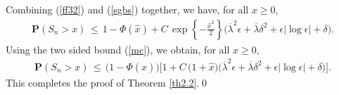 \documentclass{gSTA2e}
\theoremstyle{plain}
\theoremstyle{definition}
\theoremstyle{remark}
\begin{document}
Combining (\ref{ff32}) and (\ref{sgbs}) together,  we have, for all $ x\geq 0 ,$
\begin{eqnarray*}
 \mathbf{P}(S_n>x ) \, \leq \,  1- \Phi\left( \widehat{x}\right)
  +  C\, \exp \left\{- \frac{\widehat{x}^2}{2 }  \right\}  \Big(\overline{\lambda}^2 \epsilon + \overline{\lambda} \delta^2 + \epsilon \left| \log  \epsilon
 \right| +   \delta  \Big)  .
\end{eqnarray*}
Using the two sided bound (\ref{mc}),
we obtain, for all $ x\geq 0 ,$
\begin{eqnarray*}
 \mathbf{P}(S_n>x ) \, \leq \, \Big( 1- \Phi\left(\widehat{x}\right)\Big)  \Big[ 1+ C \,\Big(1+\widehat{x} \Big)  \Big(\overline{\lambda}^2 \epsilon + \overline{\lambda} \delta^2 + \epsilon \left| \log  \epsilon
 \right| +   \delta \Big ) \Big].\label{fineth1}
\end{eqnarray*}
 This completes the proof of Theorem \ref{th2.2}.\hfill\qed
\end{document}
